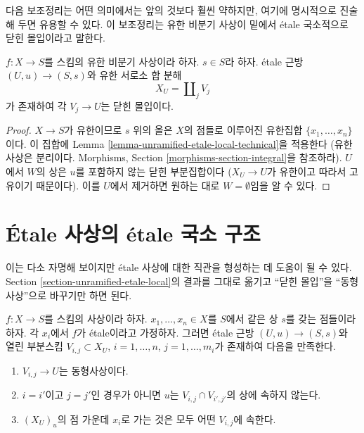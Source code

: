 \noindent
다음 보조정리는 어떤 의미에서는 앞의 것보다 훨씬 약하지만,
여기에 명시적으로 진술해 두면 유용할 수 있다. 이 보조정리는
유한 비분기 사상이 밑에서 \'etale 국소적으로 닫힌 몰입이라고 말한다.

\begin{lemma}
\label{lemma-finite-unramified-etale-local}
$f : X \to S$를 스킴의 유한 비분기 사상이라 하자.
$s \in S$라 하자.
\'etale 근방 $(U, u) \to (S, s)$와 유한 서로소 합 분해
$$
X_U = \coprod\nolimits_j V_j
$$
가 존재하여 각 $V_j \to U$는 닫힌 몰입이다.
\end{lemma}

\begin{proof}
$X \to S$가 유한이므로 $s$ 위의 올은 $X$의 점들로 이루어진
유한집합 $\{x_1, \ldots, x_n\}$이다.
이 집합에 Lemma \ref{lemma-unramified-etale-local-technical}을 적용한다
(유한 사상은 분리이다. Morphisms, Section
\ref{morphisms-section-integral}을 참조하라).
$U$에서 $W$의 상은 $u$를 포함하지 않는 닫힌 부분집합이다
($X_U \to U$가 유한이고 따라서 고유이기 때문이다).
이를 $U$에서 제거하면 원하는 대로 $W = \emptyset$임을 알 수 있다.
\end{proof}




\section{\'Etale 사상의 \'etale 국소 구조}
\label{section-etale-local-etale}

\noindent
이는 다소 자명해 보이지만 \'etale 사상에 대한 직관을 형성하는 데
도움이 될 수 있다. Section \ref{section-unramified-etale-local}의 결과를
그대로 옮기고 “닫힌 몰입”을 “동형사상”으로 바꾸기만 하면 된다.

\begin{lemma}
\label{lemma-etale-etale-local}
$f : X \to S$를 스킴의 사상이라 하자.
$x_1, \ldots, x_n \in X$를 $S$에서 같은 상 $s$를 갖는 점들이라 하자.
각 $x_i$에서 $f$가 \'etale이라고 가정하자.
그러면 \'etale 근방 $(U, u) \to (S, s)$와 열린 부분스킴
$V_{i, j} \subset X_U$, $i = 1, \ldots, n$, $j = 1, \ldots, m_i$가 존재하여
다음을 만족한다.
\begin{enumerate}
\item $V_{i, j} \to U$는 동형사상이다.
\item $i = i'$이고 $j = j'$인 경우가 아니면
$u$는 $V_{i, j} \cap V_{i', j'}$의 상에 속하지 않는다.
\item $(X_U)_u$의 점 가운데 $x_i$로 가는 것은 모두 어떤 $V_{i, j}$에 속한다.
\end{enumerate}
\end{lemma}

